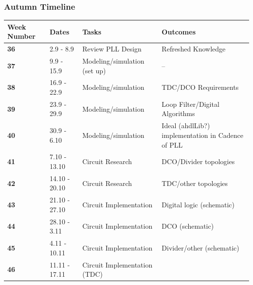 \documentclass[t, screen, aspectratio=43]{beamer}
\begin{document}
\begin{frame}
	\frametitle{Autumn Timeline}
	\begin{table}[htb!]
		\tiny
		\centering
		\def\arraystretch{1.5}		
		\setlength\arrayrulewidth{0.75pt}
		\setlength{\tabcolsep}{1em} %
		\begin{tabular}{|l|l|l|l|}
			\hline 
			\rule[-1ex]{0pt}{2.5ex} \cellcolor{gray!40}\textbf{Week Number} & \cellcolor{gray!40}\textbf{Dates} &\cellcolor{gray!40}\textbf{Tasks} & \cellcolor{gray!40}\textbf{Outcomes}\\ 
			\hline 
			\rule[-1ex]{0pt}{2.5ex} \cellcolor{red!20}\textbf{36}& \cellcolor{red!20}2.9 - 8.9 & \cellcolor{red!20}Review PLL Design & \cellcolor{red!20}Refreshed Knowledge\\ 
			\hline 
			\rule[-1ex]{0pt}{2.5ex} \cellcolor{red!20}\textbf{37}& \cellcolor{red!20}9.9 - 15.9 & \cellcolor{red!20}Modeling/simulation (set up) & \cellcolor{red!20}--\\ 
			\hline 
			\rule[-1ex]{0pt}{2.5ex} \cellcolor{red!20}\textbf{38}& \cellcolor{red!20}16.9 - 22.9 & \cellcolor{red!20}Modeling/simulation &\cellcolor{red!20} TDC/DCO Requirements\\ 
			\hline 
			\rule[-1ex]{0pt}{2.5ex} \textbf{39}& 23.9 - 29.9& Modeling/simulation& Loop Filter/Digital Algorithms\\ 
			\hline 
			\rule[-1ex]{0pt}{2.5ex} \textbf{40}& 30.9 - 6.10& Modeling/simulation& Ideal (ahdlLib?) implementation in Cadence of PLL\\ 
			\hline 
			\rule[-1ex]{0pt}{2.5ex} \textbf{41}& 7.10 - 13.10& Circuit Research & DCO/Divider topologies\\ 
			\hline 
			\rule[-1ex]{0pt}{2.5ex} \textbf{42}& 14.10 - 20.10& Circuit Research & TDC/other topologies\\ 
			\hline 
			\rule[-1ex]{0pt}{2.5ex} \textbf{43}& 21.10 - 27.10& Circuit Implementation& Digital logic (schematic)\\ 
			\hline 
			\rule[-1ex]{0pt}{2.5ex} \textbf{44}& 28.10 - 3.11& Circuit Implementation& DCO (schematic)\\ 
			\hline 
			\rule[-1ex]{0pt}{2.5ex} \textbf{45}& 4.11 - 10.11& Circuit Implementation& Divider/other (schematic)\\ 
			\hline 
			\rule[-1ex]{0pt}{2.5ex} \textbf{46}& 11.11 - 17.11& Circuit Implementation (TDC)& \\ 

\end{tabular}
\end{table}
\end{frame}
\end{document}
